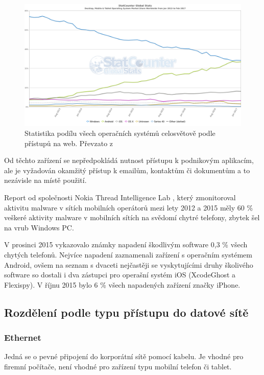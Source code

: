 \begin{figure}[h]
\includegraphics[width=13cm]{img/StatCounter_All_Worldwide}
\caption{Statistika podílu všech operačních systémů celosvětově podle přístupů na web. Převzato z \cite{http://gs.statcounter.com/os-market-share/}} 
\centering
\end{figure}
 
Od těchto zařízení se nepředpokládá nutnost přístupu k podnikovým aplikacím, ale je vyžadován okamžitý přístup k emailům, kontaktům či dokumentům a to nezávisle na místě použití.

Report od společnosti Nokia Thread Intelligence Lab , který zmonitoroval aktivitu malware v sítích mobilních operátorů mezi lety 2012 a 2015 měly 60 \% veškeré aktivity malware v mobilních sítích na svědomí chytré telefony, zbytek šel na vrub Windows PC.

V prosinci 2015 vykazovalo známky napadení škodlivým software 0,3 \% všech chytých telefonů. Nejvíce napadení zaznamenali zařízení s operačním systémem Android, ovšem na seznam s dvaceti nejčastěji se vyskytujícími druhy školivého software so dostali i dva zástupci pro operašní systém iOS (XcodeGhost a Flexispy). V říjnu 2015 bylo 6 \% všech napadených zařízení značky iPhone.
 
 
 \subsection{Rozdělení podle typu přístupu do datové sítě}
 \subsubsection{Ethernet}
 Jedná se o pevné připojení do korporátní sítě pomocí kabelu. Je vhodné pro firemní počítače, není vhodné pro zařízení typu mobilní telefon či tablet.
 
